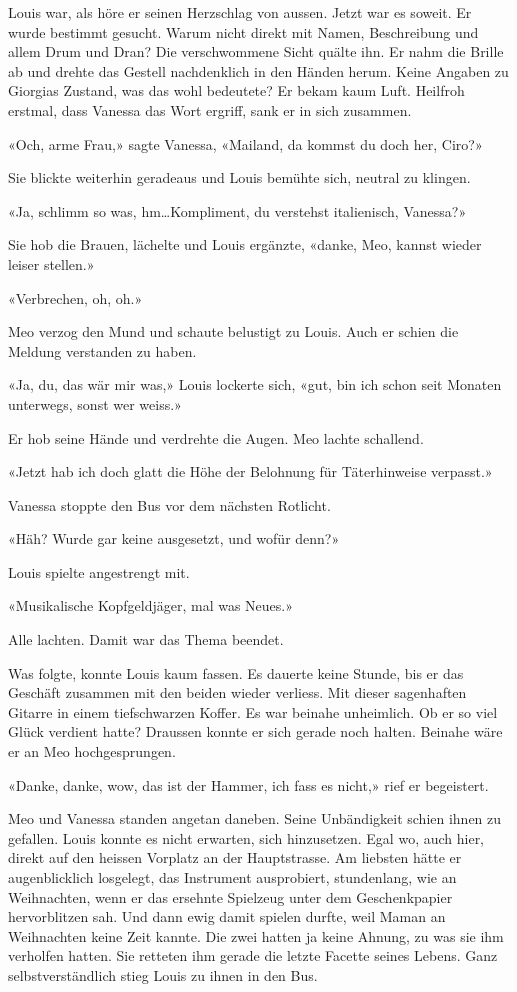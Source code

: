 \sectionbreak

Louis war, als höre er seinen Herzschlag von aussen. 
Jetzt war es soweit. Er wurde bestimmt gesucht. Warum nicht direkt mit
Namen, Beschreibung und allem Drum und Dran? 
Die verschwommene Sicht quälte ihn. Er nahm die Brille ab und drehte das
Gestell nachdenklich in den Händen herum.
Keine Angaben zu Giorgias Zustand, was das wohl bedeutete? Er bekam kaum
Luft.
Heilfroh erstmal, dass Vanessa das Wort ergriff, sank er in sich
zusammen.

«Och, arme Frau,» sagte Vanessa, «Mailand, da kommst du doch her, Ciro?»

Sie blickte weiterhin geradeaus und Louis bemühte sich, neutral zu klingen.

«Ja, schlimm so was, hm…Kompliment, du verstehst italienisch,
Vanessa?»

Sie hob die Brauen, lächelte und Louis ergänzte, «danke, Meo, kannst wieder leiser stellen.»

«Verbrechen, oh, oh.»

Meo verzog den Mund und schaute belustigt zu Louis. Auch er schien die Meldung
verstanden zu haben.

«Ja, du, das wär mir was,» Louis lockerte sich, «gut, bin ich schon seit
Monaten unterwegs, sonst wer weiss.»

Er hob seine Hände und verdrehte die Augen.
Meo lachte schallend.

«Jetzt hab ich doch glatt die Höhe der Belohnung für Täterhinweise 
verpasst.»

Vanessa stoppte den Bus vor dem nächsten Rotlicht.

«Häh? Wurde gar keine ausgesetzt, und wofür denn?»

Louis spielte angestrengt mit.

«Musikalische Kopfgeldjäger, mal was Neues.»

Alle lachten. Damit war das Thema beendet.

\sectionbreak

Was folgte, konnte Louis kaum fassen.
Es dauerte keine Stunde, bis er das Geschäft zusammen mit den beiden wieder verliess. 
Mit dieser sagenhaften Gitarre in einem
tiefschwarzen Koffer. Es war beinahe unheimlich. Ob er so viel Glück verdient hatte?
Draussen konnte er sich gerade noch halten. Beinahe wäre er an Meo hochgesprungen.

«Danke, danke, wow, das ist der Hammer, ich fass es nicht,» rief er begeistert.

Meo und Vanessa standen angetan daneben. Seine Unbändigkeit schien ihnen zu gefallen.
Louis konnte es nicht erwarten, sich hinzusetzen. Egal wo, auch hier,
direkt auf den heissen Vorplatz an der Hauptstrasse. Am liebsten hätte
er augenblicklich losgelegt, das Instrument ausprobiert, stundenlang, 
wie an Weihnachten, wenn er das ersehnte Spielzeug unter dem
Geschenkpapier hervorblitzen sah. Und dann ewig damit spielen durfte,
weil Maman an Weihnachten keine Zeit kannte.
Die zwei hatten ja keine Ahnung, zu was sie ihm verholfen hatten. Sie
retteten ihm gerade die letzte Facette seines Lebens.
Ganz selbstverständlich stieg Louis zu ihnen in den Bus.


